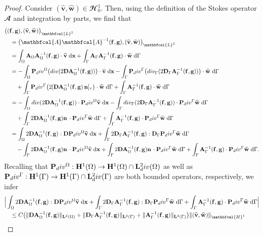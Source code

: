\documentclass[10pt,a4paper]{amsart}
\newcommand{\A}{\mathbf{A}}
\newcommand{\Bigabs}[1]{\Big| #1 \Big|}
\newcommand{\Dg}{\mathbf{D}_\Gamma}
\newcommand{\Divg}{\textnormal{div}_\Ga}
\newcommand{\Div}{\textnormal{div}}
\newcommand{\D}{\mathbf{D}}
\newcommand{\Ga}{\Gamma}
\newcommand{\Om}{\Omega}
\newcommand{\bigscp}[2]{\big( #1 , #2 \big)}
\newcommand{\bv}{\mathbf{v}}
\newcommand{\bw}{\mathbf{w}}
\newcommand{\dG}{\;\mathrm d\Ga}
\newcommand{\dx}{\;\mathrm d\mathbf{x}}
\newcommand{\f}{\mathbf{f}}
\newcommand{\g}{\mathbf{g}}
\newcommand{\intG}{\int_\Gamma}
\newcommand{\intO}{\int_\Omega}
\newcommand{\norm}[1]{\| #1 \|}
\newcommand{\n}{\mathbf{n}}
\newcommand{\wv}{\widehat{\bv}}
\newcommand{\ww}{\widehat{\bw}}
\begin{document}
\begin{proof}
    Consider $(\wv,\ww)\in\mathbfcal{H}^1_0$. Then, using the definition of the Stokes operator $\mathbfcal{A}$ and integration by parts, we find that
    \begin{align*}
        &\bigscp{(\f,\g)}{(\wv,\ww)}_{\mathbfcal{L}^2} \\
        &\quad = \bigscp{\mathbfcal{A}\mathbfcal{A}^{-1}(\f,\g)}{(\wv,\ww)}_{\mathbfcal{L}^2} \\
        &\quad = \intO \mathbf{A}_\Om\mathbf{A}_\Om^{-1}(\f,\g)\cdot\wv\dx + \intG \mathbf{A}_\Ga\mathbf{A}_\Ga^{-1}(\f,\g)\cdot\ww\dG \\
        &\quad = - \intO \mathbf{P}_\Div^\Om\big(\Div(2\D\mathbf{A}_\Om^{-1}(\f,\g))\big)\cdot\wv \dx - \intG \mathbf{P}_\Div^\Ga\big(\Divg(2\Dg\mathbf{A}_\Ga^{-1}(\f,\g))\big)\cdot\ww \dG \\
        &\qquad + \intG \mathbf{P}_\Div^\Ga\big(2[\D\mathbf{A}_\Om^{-1}(\f,\g)\,\n]_\tau\big)\cdot\ww\dG + \intG \mathbf{A}_\Ga^{-1}(\f,\g)\cdot\ww\dG \\
        &\quad = - \intO \Div(2\D\A_\Om^{-1}(\f,\g))\cdot\mathbf{P}_\Div^\Om\wv\dx - \intG \Divg(2\Dg\A_\Ga^{-1}(\f,\g))\cdot\mathbf{P}_\Div^\Ga\ww\dG \\
        &\qquad + \intG 2\D\mathbf{A}_\Om^{-1}(\f,\g)\n\,\cdot\mathbf{P}_\Div^\Ga\ww\dG + \intG \mathbf{A}_\Ga^{-1}(\f,\g)\cdot\mathbf{P}_\Div^\Ga\ww\dG \\
        &\quad = \intO 2\D\A_\Om^{-1}(\f,\g):\D\mathbf{P}_\Div^\Om\wv\dx + \intG 2\Dg\A_\Ga^{-1}(\f,\g):\Dg\mathbf{P}_\Div^\Ga\ww\dG \\
        &\qquad - \intG 2\D\A_\Om^{-1}(\f,\g)\n\,\cdot\mathbf{P}_\Div^\Om\wv\dx + \intG 2\D\A_\Om^{-1}(\f,\g)\n\,\cdot\mathbf{P}_\Div^\Ga\ww\dG + \intG \mathbf{A}_\Ga^{-1}(\f,\g)\cdot\mathbf{P}_\Div^\Ga\ww\dG.
    \end{align*}
    Recalling that $\mathbf{P}_\Div^\Om:\mathbf{H}^1(\Om)\rightarrow\mathbf{H}^1(\Om)\cap\mathbf{L}^2_\Div(\Om)$ as well as $\mathbf{P}_\Div^\Ga:\mathbf{H}^1(\Ga)\rightarrow\mathbf{H}^1(\Ga)\cap\mathbf{L}^2_\Div(\Ga)$ are both bounded operators, respectively, we infer
    \begin{align*}
        &\Bigabs{\intO 2\D\A_\Om^{-1}(\f,\g):\D\mathbf{P}_\Div^\Om\wv\dx + \intG 2\Dg\A_\Ga^{-1}(\f,\g):\Dg\mathbf{P}_\Div^\Ga\ww\dG  + \intG \mathbf{A}_\Ga^{-1}(\f,\g)\cdot\mathbf{P}_\Div^\Ga\ww\dG} \\
        &\quad\leq C\big(\norm{\D\mathbf{A}_\Om^{-1}(\f,\g)}_{\mathbf{L}^2(\Om)} + \norm{\Dg\mathbf{A}_\Ga^{-1}(\f,\g)}_{\mathbf{L}^2(\Ga)} + \norm{\mathbf{A}_\Ga^{-1}(\f,\g)}_{\mathbf{L}^2(\Ga)}\big)\norm{(\wv,\ww)}_{\mathbfcal{H}^1} \\

\end{align*}
\end{proof}
\end{document}
